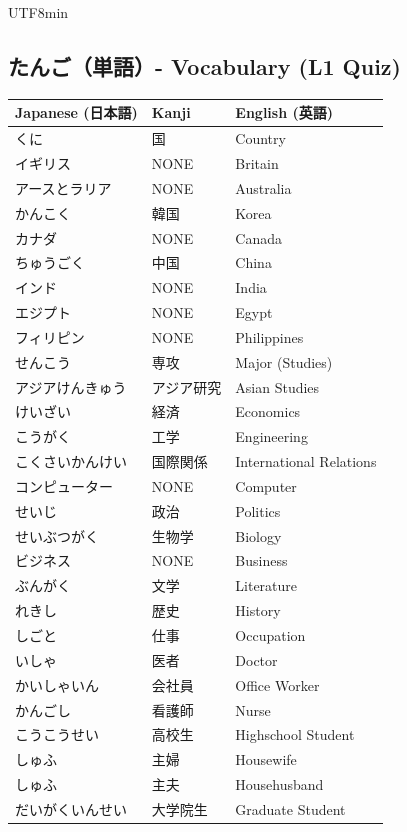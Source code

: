 \documentclass[11pt]{article}
\begin{document}
\begin{CJK}{UTF8}{min}
\subsection{たんご（単語）- Vocabulary (L1 Quiz)}
\begin{tabularx}{\linewidth}{X | X | X}
    \toprule
    \textbf{Japanese (日本語)} & \textbf{Kanji} & \textbf{English (英語)} \\
    \midrule
    くに & 国 & Country \\
    イギリス & NONE & Britain \\
    アースとラリア & NONE & Australia \\
    かんこく & 韓国 & Korea \\
    カナダ & NONE & Canada \\
    ちゅうごく & 中国 & China \\
    インド & NONE & India \\
    エジプト & NONE & Egypt \\
    フィリピン & NONE & Philippines \\
    \hline
    せんこう & 専攻 & Major (Studies) \\
    アジアけんきゅう & アジア研究 & Asian Studies \\
    けいざい & 経済 & Economics \\
    こうがく & 工学 & Engineering \\
    こくさいかんけい & 国際関係 & International Relations \\
    コンピューター & NONE & Computer \\
    せいじ & 政治 & Politics \\
    せいぶつがく & 生物学 & Biology \\
    ビジネス & NONE & Business \\
    ぶんがく & 文学 & Literature \\
    れきし & 歴史 & History \\
    \hline
    しごと & 仕事 & Occupation \\
    いしゃ & 医者 & Doctor \\
    かいしゃいん & 会社員 & Office Worker \\
    かんごし & 看護師 & Nurse \\
    こうこうせい & 高校生 & Highschool Student \\
    しゅふ & 主婦 & Housewife \\
    しゅふ & 主夫 & Househusband \\
    だいがくいんせい & 大学院生 & Graduate Student \\

\end{tabularx}
\end{CJK}
\end{document}
